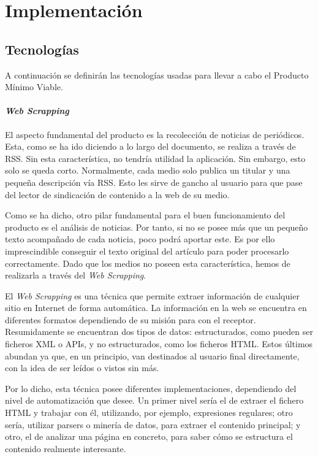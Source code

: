 
\chapter{Implementación}\label{implementacion}
\section{Tecnologías}\label{sec:tecnologias}

A continuación se definirán las tecnologías usadas para llevar a cabo el Producto Mínimo Viable.

\subsubsection{\textit{Web Scrapping}}
El aspecto fundamental del producto es la recolección de noticias de periódicos. Esta, como se ha ido diciendo a lo largo del documento, se realiza a través de RSS. Sin esta característica, no tendría utilidad la aplicación. Sin embargo, esto solo se queda corto. Normalmente, cada medio solo publica un titular y una pequeña descripción vía RSS. Esto les sirve de gancho al usuario para que pase del lector de sindicación de contenido a la web de su medio.

Como se ha dicho, otro pilar fundamental para el buen funcionamiento del producto es el análisis de noticias. Por tanto, si no se posee más que un pequeño texto acompañado de cada noticia, poco podrá aportar este. Es por ello imprescindible conseguir el texto original del artículo para poder procesarlo correctamente. Dado que los medios no poseen esta característica, hemos de realizarla a través del \textit{Web Scrapping}.

El \textit{Web Scrapping} es una técnica que permite extraer información de cualquier sitio en Internet de forma automática. La información en la web se encuentra en diferentes formatos dependiendo de su misión para con el receptor. Resumidamente se encuentran dos tipos de datos: estructurados, como pueden ser ficheros XML o APIs, y no estructurados, como los ficheros HTML. Estos últimos abundan ya que, en un principio, van destinados al usuario final directamente, con la idea de ser leídos o vistos sin más.


Por lo dicho, esta técnica posee diferentes implementaciones, dependiendo del nivel de automatización que desee. Un primer nivel sería el de extraer el fichero HTML y trabajar con él, utilizando, por ejemplo, expresiones regulares; otro sería, utilizar parsers o minería de datos, para extraer el contenido principal; y otro, el de analizar una página en concreto, para saber cómo se estructura el contenido realmente interesante.

